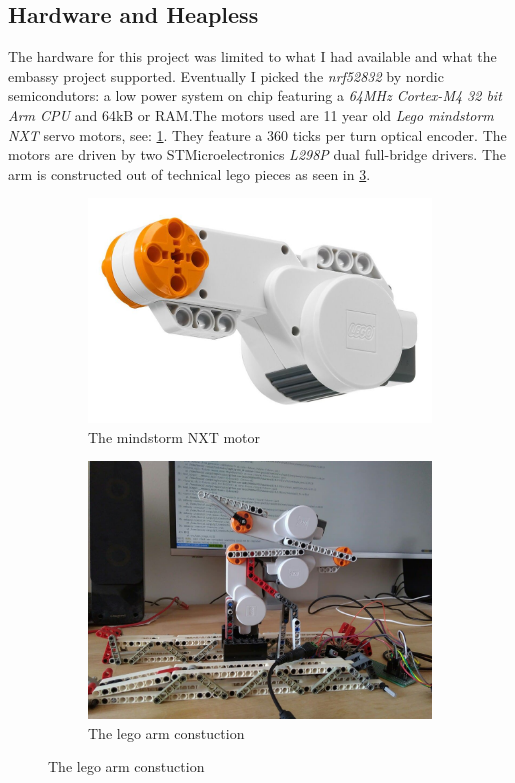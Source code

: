 \documentclass[lang=en, hanging-titles=true]{skrapport}
\begin{document}
\subsection{Hardware and Heapless} \label{sec:hw}
The hardware for this project was limited to what I had available and what the embassy project supported. Eventually I picked the \textit{nrf52832} by nordic semicondutors: a low power system on chip featuring a \textit{64MHz Cortex-M4 32 bit Arm CPU} and 64kB or RAM.The motors used are 11 year old \textit{Lego mindstorm NXT} servo motors, see: \cref{fig:motor}. They feature a 360 ticks per turn optical encoder. The motors are driven by two STMicroelectronics \textit{L298P} dual full-bridge drivers. The arm is constructed out of technical lego pieces as seen in \cref{fig:arm}.
%
\begin{figure}
	\centering
	\begin{subfigure}[b]{0.5\linewidth}
		\centering
		\includegraphics[width=\linewidth]{figs/motor}
		\caption{The mindstorm NXT motor}
		\label{fig:motor}
	\end{subfigure}%
	\begin{subfigure}[b]{0.5\linewidth}
		\centering
		\includegraphics[width=\linewidth]{figs/arm_rest}
		\caption{The lego arm constuction}
		\label{fig:arm}
	\end{subfigure}
\end{figure}
%
\end{document}
